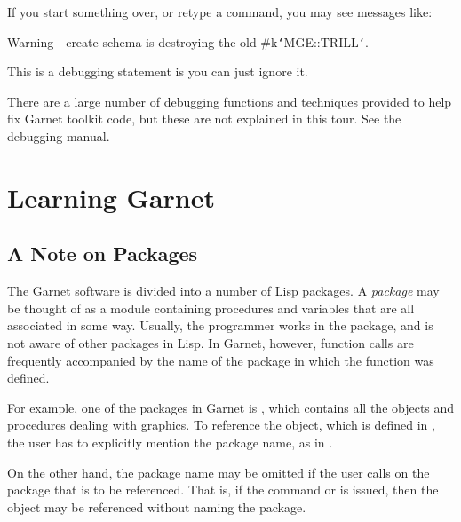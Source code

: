 If you start something over, or retype a command, you may see messages
like:
\begin{programexample}
Warning - create-schema is destroying the old \#k{\tt\char`\<}MGE::TRILL{\tt\char`\>}.
\end{programexample}
This is a debugging statement is you can just ignore it.

There are a large number of debugging functions and techniques provided to
help fix Garnet toolkit code, but these are not explained in this tour.
See the debugging manual.

% 
% 
% 
\chapter{Learning Garnet}
\label{LearnGarnet}

\section{A Note on Packages}

The Garnet software is divided into a number of Lisp packages.  A
{\it package} may be thought of as a module containing procedures and
variables that are all associated in some way.  Usually, the
programmer works in the  package, and is not aware of
other packages in Lisp.  In Garnet, however, function calls are
frequently accompanied by the name of the package in which the function
was defined.

For example, one of the packages in Garnet is , which
contains all the objects and procedures dealing with graphics.  To
reference the  object, which is defined in ,
the user has to explicitly mention the package name, as in
.

On the other hand, the package name may be omitted if the user
calls  on the package that is to be referenced.  That
is, if the command  or  is issued, then the  object may be referenced
without naming the  package.

